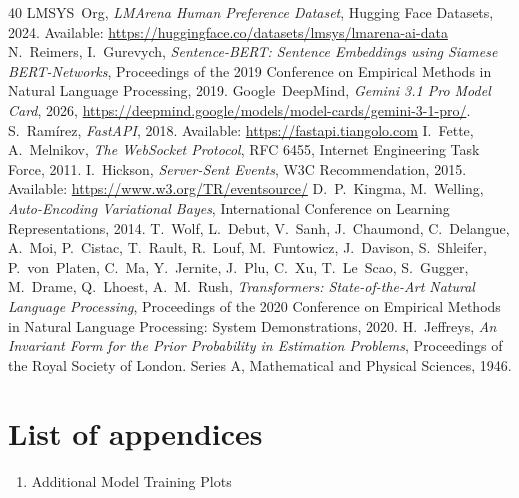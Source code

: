 \documentclass[a4paper,11pt,twoside]{report}
\theoremstyle{definition}
\begin{document}
\begin{thebibliography}{40}
 LMSYS~Org, \emph{LMArena Human Preference Dataset}, Hugging Face Datasets, 2024. Available: \url{https://huggingface.co/datasets/lmsys/lmarena-ai-data}
 N.~Reimers, I.~Gurevych, \emph{Sentence-BERT: Sentence Embeddings using Siamese BERT-Networks}, Proceedings of the 2019 Conference on Empirical Methods in Natural Language Processing, 2019.
 Google~DeepMind, \emph{Gemini 3.1 Pro Model Card}, 2026, \url{https://deepmind.google/models/model-cards/gemini-3-1-pro/}.
 S.~Ramírez, \emph{FastAPI}, 2018. Available: \url{https://fastapi.tiangolo.com}
 I.~Fette, A.~Melnikov, \emph{The WebSocket Protocol}, RFC 6455, Internet Engineering Task Force, 2011.
 I.~Hickson, \emph{Server-Sent Events}, W3C Recommendation, 2015. Available: \url{https://www.w3.org/TR/eventsource/}
 D.~P.~Kingma, M.~Welling, \emph{Auto-Encoding Variational Bayes}, International Conference on Learning Representations, 2014.
 T.~Wolf, L.~Debut, V.~Sanh, J.~Chaumond, C.~Delangue, A.~Moi, P.~Cistac, T.~Rault, R.~Louf, M.~Funtowicz, J.~Davison, S.~Shleifer, P.~von~Platen, C.~Ma, Y.~Jernite, J.~Plu, C.~Xu, T.~Le~Scao, S.~Gugger, M.~Drame, Q.~Lhoest, A.~M.~Rush, \emph{Transformers: State-of-the-Art Natural Language Processing}, Proceedings of the 2020 Conference on Empirical Methods in Natural Language Processing: System Demonstrations, 2020.
 H.~Jeffreys, \emph{An Invariant Form for the Prior Probability in Estimation Problems}, Proceedings of the Royal Society of London. Series A, Mathematical and Physical Sciences, 1946.

\end{thebibliography}
\thispagestyle{empty}

\listoffigures
\thispagestyle{empty}

\listoftables
\thispagestyle{empty}

\chapter*{List of appendices}

\begin{enumerate}
\item Additional Model Training Plots
\end{enumerate}
\thispagestyle{empty}
\end{document}

